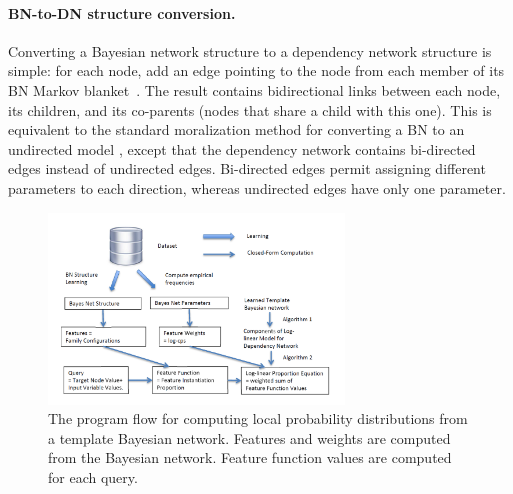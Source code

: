 \documentclass[runningheads,a4paper]{llncs}
\begin{document}
\paragraph{BN-to-DN structure conversion.}
Converting a Bayesian network structure to a dependency network structure is simple: for each node, add an edge pointing to the node from each member of its BN Markov blanket~\cite{Heckerman2000}.  The result contains  bidirectional links between each node, its children, and its co-parents (nodes that share a child with this one). 
%
This is equivalent to the standard moralization  method for converting a BN to an undirected model \cite{Domingos2009}, except that the dependency network contains bi-directed edges instead of undirected edges. Bi-directed edges permit  assigning different parameters to each direction, whereas undirected edges have only one parameter. 
\begin{figure}[t]
\begin{center}
\includegraphics[width=0.7\textwidth]{bn-regress.png}
\caption{The program flow for computing local probability distributions from a template Bayesian network. Features and weights are computed from the Bayesian network. Feature function values are computed for each query. \label{fig:bn-flow}}
\end{center}
\end{figure}
\end{document}
